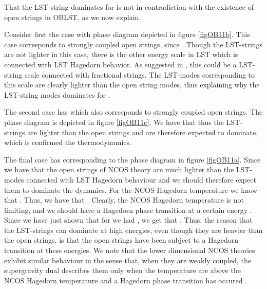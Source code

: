 \documentclass[a4paper,twoside,titlepage,12pt]{article}
\begin{document}
That the LST-string dominates for \coordHE{} 
is not in contradiction with the existence of open strings
in \coordHE{} OBLST, as we now explain.

Consider first the case \coordHE{} with phase
diagram depicted in figure \ref{figOB11b}.
This case corresponds to strongly coupled open strings, since 
\coordHE{}.
Though the LST-strings are not lighter in this case, there
is the other energy scale \coordHE{} in LST
which is connected with LST Hagedorn behavior. 
As suggested in \cite{Maldacena:1996ya,Harmark:2000hw}, 
this could be a LST-string scale
connected with fractional strings. 
The LST-modes corresponding to this scale are clearly lighter than
the open string modes, thus explaining why the
LST-string modes dominates for \coordHE{}.

The second case has \coordHE{} 
which also corresponds to strongly coupled open strings.
The phase diagram is depicted in figure \ref{figOB11c}.
We have that \coordHE{} thus the LST-strings are lighter
than the open strings and are therefore expected to dominate,
which is confirmed the thermodynamics.

The final case has \coordHE{}
corresponding to the phase diagram in figure \ref{figOB11a}.
Since we have that \coordHE{} the open strings of NCOS theory
are much lighter than the LST-modes connected with LST Hagedorn behaviour 
and we should therefore expect them to dominate the dynamics.
For the NCOS Hagedorn temperature \myHighlight{$\tncos$}\coordHE{} we know that 
\coordHE{}.
Thus, we have that \myHighlight{$\tncos \ll \tlst$}\coordHE{}.
Clearly, the NCOS Hagedorn temperature is not limiting,
and we should have a Hagedorn phase transition at a certain energy
\myHighlight{$\uncos$}\coordHE{}.
Since we have just shown that for \coordHE{}
we had \coordHE{}, we get that \coordHE{}.
Thus, the reason that the LST-strings can dominate at high energies, 
even though they are heavier than the open strings, is that 
the open strings have been subject to a Hagedorn transition
at these energies.
We note that the lower dimensional NCOS theories exhibit similar behaviour
in the sense that, when they are weakly coupled, the supergravity dual
describes them only when the temperature are above the NCOS Hagedorn
temperature and a Hagedorn phase transition has occured \cite{Harmark:2000wv}.
\end{document}
